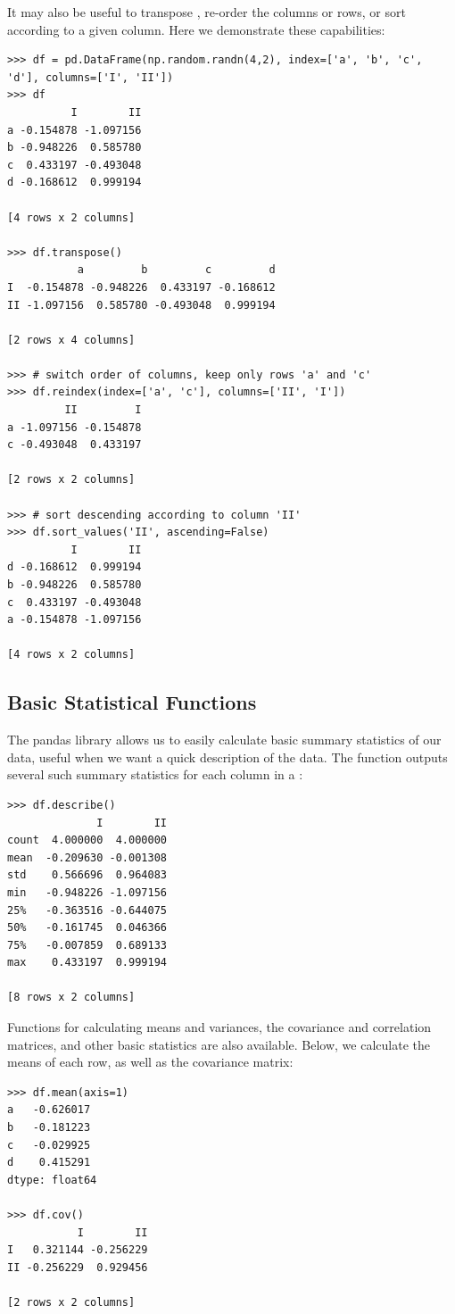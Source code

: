 It may also be useful to transpose , re-order the columns or rows, or sort according to a
given column. Here we demonstrate these capabilities:
\begin{lstlisting}
>>> df = pd.DataFrame(np.random.randn(4,2), index=['a', 'b', 'c', 'd'], columns=['I', 'II'])
>>> df
          I        II
a -0.154878 -1.097156
b -0.948226  0.585780
c  0.433197 -0.493048
d -0.168612  0.999194

[4 rows x 2 columns]

>>> df.transpose()
           a         b         c         d
I  -0.154878 -0.948226  0.433197 -0.168612
II -1.097156  0.585780 -0.493048  0.999194

[2 rows x 4 columns]

>>> # switch order of columns, keep only rows 'a' and 'c'
>>> df.reindex(index=['a', 'c'], columns=['II', 'I'])
         II         I
a -1.097156 -0.154878
c -0.493048  0.433197

[2 rows x 2 columns]

>>> # sort descending according to column 'II'
>>> df.sort_values('II', ascending=False)
          I        II
d -0.168612  0.999194
b -0.948226  0.585780
c  0.433197 -0.493048
a -0.154878 -1.097156

[4 rows x 2 columns]
\end{lstlisting}

\subsection*{Basic Statistical Functions}
The pandas library allows us to easily calculate basic summary statistics of our data,
useful when we want a quick description of the data. The  function
outputs several such summary statistics for each column in a :
\begin{lstlisting}
>>> df.describe()
              I        II
count  4.000000  4.000000
mean  -0.209630 -0.001308
std    0.566696  0.964083
min   -0.948226 -1.097156
25%   -0.363516 -0.644075
50%   -0.161745  0.046366
75%   -0.007859  0.689133
max    0.433197  0.999194

[8 rows x 2 columns]
\end{lstlisting}

Functions for calculating means and variances, the covariance and correlation matrices, and other
basic statistics are also available. Below, we calculate the means of each row, as well as the
covariance matrix:
\begin{lstlisting}
>>> df.mean(axis=1)
a   -0.626017
b   -0.181223
c   -0.029925
d    0.415291
dtype: float64

>>> df.cov()
           I        II
I   0.321144 -0.256229
II -0.256229  0.929456

[2 rows x 2 columns]
\end{lstlisting}

